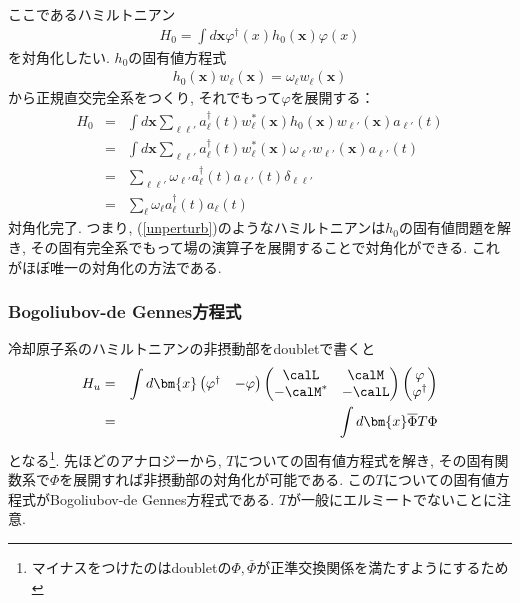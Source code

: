 \documentclass[10.5pt,a4paper]{jreport}
\begin{document}
ここであるハミルトニアン
\begin{eqnarray}
  H_0 = \int d\bm{x} \varphi^\dagger(x)h_0(\bm{x})\varphi(x)\label{unperturb}
\end{eqnarray}
を対角化したい. $h_0$の固有値方程式
\begin{eqnarray}
  h_0(\bm{x})w_\ell(\bm{x}) = \omega_\ell w_\ell(\bm{x})
\end{eqnarray}
から正規直交完全系をつくり, それでもって$\varphi$を展開する：
\begin{eqnarray}
  H_0 &=& \int d\bm{x} \sum_{\ell\ell'}a^\dagger_\ell(t)w^*_\ell(\bm{x})h_0(\bm{x})w_{\ell'}(\bm{x})a_{\ell'}(t)\\
  &=& \int d\bm{x} \sum_{\ell\ell'}a^\dagger_\ell(t)w^*_\ell(\bm{x})\omega_{\ell'}w_{\ell'}(\bm{x})a_{\ell'}(t)\\
  &=& \sum_{\ell\ell'}\omega_{\ell'}a^\dagger_\ell(t)a_{\ell'}(t)\delta_{\ell\ell'}\\
  &=& \sum_{\ell}\omega_{\ell}a^\dagger_\ell(t)a_{\ell}(t)
\end{eqnarray}
対角化完了. つまり, (\ref{unperturb})のようなハミルトニアンは$h_0$の固有値問題を解き, その固有完全系でもって場の演算子を展開することで対角化ができる. これがほぼ唯一の対角化の方法である.
\subsubsection{Bogoliubov-de Gennes方程式}
冷却原子系のハミルトニアンの非摂動部をdoubletで書くと
\begin{eqnarray}
  H_u &=&  \int d\bm{x}
  \begin{pmatrix}
    \varphi^\dagger&-\varphi 
  \end{pmatrix}
  \begin{pmatrix}
    \calL &\calM\\
    -\calM^* &-\calL
  \end{pmatrix}
  \begin{pmatrix}
    \varphi\\
    \varphi^\dagger 
  \end{pmatrix}\\
  &=& \int d\bm{x} \overline{\Phi}T\Phi
\end{eqnarray}
となる\footnote{マイナスをつけたのはdoubletの$\Phi, \overline{\Phi}$が正準交換関係を満たすようにするため}. 先ほどのアナロジーから, $T$についての固有値方程式を解き, その固有関数系で$\Phi$を展開すれば非摂動部の対角化が可能である. この$T$についての固有値方程式がBogoliubov-de Gennes方程式である. $T$が一般にエルミートでないことに注意.
\end{document}
